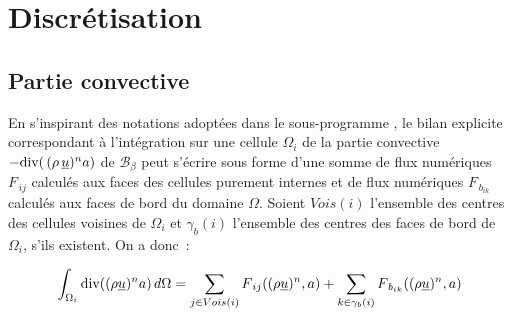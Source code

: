 %
%
%
%
%
%
%
%
\section{Discr\'etisation}
\subsection{\bf Partie convective}
En s'inspirant des notations adopt\'ees dans le sous-programme , le  bilan explicite correspondant \`a l'int\'egration sur une cellule $\Omega_i$
de la partie convective $-{\text{div}(\,(\rho\,\underline{u})^n  a)}$ de $\mathcal{B_{\mathcal{\beta}}}$
 peut s'\'ecrire sous forme
d'une somme de flux num\'eriques $F_{\,ij}$ calcul\'es aux faces des
cellules purement internes et de flux num\'eriques $F_{\,b_{ik}}$
calcul\'es aux faces de bord du domaine $\Omega$.
Soient $Vois(i)$ l'ensemble des centres des cellules voisines de ${\Omega_i}$ et
$\gamma_b(i)$ l'ensemble des centres des faces de bord de ${\Omega_i}$, s'ils existent. On a donc~:

\begin{equation}\notag
\int_{\Omega_i}{\text{div}( (\rho \underline{u})^n  a )\, d\Omega} =
\sum_{j\in Vois(i)}{F_{\,ij}((\rho \underline{u})^n, a)}
+\sum_{k\in {\gamma_b(i)}} {F_{\,{b}_{ik}}((\rho \underline{u})^n,a)}
\end{equation}

